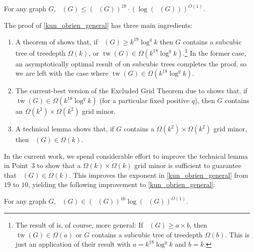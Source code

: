 \documentclass{patmorin}
\DeclareMathOperator{\tw}{tw}
\DeclareMathOperator{\chicen}{\chi_{\mathrm{cen}}}
\DeclareMathOperator{\chilin}{\chi_{\mathrm{lin}}}
\begin{document}
\begin{thm}\label{kun_obrien_general}
  For any graph $G$, $\chicen(G)\le (\chilin(G))^{19}\cdot(\log(\chilin(G)))^{O(1)}$.
\end{thm}

\noindent The proof of \cref{kun_obrien_general} has three main ingredients:
\begin{enumerate}
  \item A theorem of \citet{czerwinski.nadara.ea:improved} shows that, if $\chicen(G)\ge k^{19}\log^{q} k$ then $G$ contains a subcubic tree of treedepth $\Omega(k)$, or $\tw(G)\in\Omega(k^{18}\log^q k)$.\footnote{The result of \citet{czerwinski.nadara.ea:improved} is, of course, more general:  If $\chicen(G)\ge a\times b$, then $\tw(G)\in\Omega(a)$ or $G$ contains a subcubic tree of treedepth $\Omega(b)$. This is just an application of their result with $a=k^{18}\log^q k$ and $b=k$.}  In the former case, an asymptotically optimal result of \citet{kun.obrien.ea:polynomial} on subcubic trees completes the proof, so we are left with the case where $\tw(G)\in\Omega(k^{18}\log^q k)$.
  \item The current-best version of the Excluded Grid Theorem due to \citet{chuzhoy.tan:towards} shows that, if $\tw(G)\in\Omega(k^{18}\log^q k)$ (for a particular fixed positive $q$), then $G$ contains an $\Omega(k^2)\times \Omega(k^2)$ grid minor.
  \item A technical lemma \cite[Lemma~5]{kun.obrien.ea:polynomial} shows that, if $G$ contains a $\Omega(k^2)\times \Omega(k^2)$ grid minor, then $\chilin(G)\in\Omega(k)$.
\end{enumerate}

In the current work, we spend considerable effort to improve the technical lemma in Point~3 to show that a $\Omega(k)\times\Omega(k)$ grid minor is sufficient to guarantee that $\chilin(G)\in\Omega(k)$. This improves the exponent in \cref{kun_obrien_general} from $19$ to $10$, yielding the following improvement to \cref{kun_obrien_general}:
\begin{thm}\label{kun_obrien_general2}
  For any graph $G$, $\chicen(G)\in (\chilin(G))^{10}\log(\chilin(G))^{O(1)}$.
\end{thm}

\end{document}
